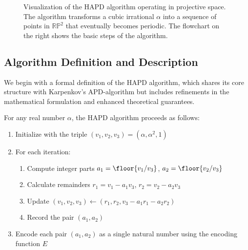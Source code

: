 \begin{figure}[h]
\caption{Visualization of the HAPD algorithm operating in projective space. The algorithm transforms a cubic irrational $\alpha$ into a sequence of points in $\mathbb{RP}^2$ that eventually becomes periodic. The flowchart on the right shows the basic steps of the algorithm.}
\label{fig:hapd_visualization}
\end{figure}

\subsection{Algorithm Definition and Description}

We begin with a formal definition of the HAPD algorithm, which shares its core structure with Karpenkov's APD-algorithm but includes refinements in the mathematical formulation and enhanced theoretical guarantees.

\begin{algorithm_def}\label{alg:hapd}
For any real number $\alpha$, the HAPD algorithm proceeds as follows:
\begin{enumerate}
    \item Initialize with the triple $(v_1, v_2, v_3) = (\alpha, \alpha^2, 1)$
    \item For each iteration:
    \begin{enumerate}
        \item Compute integer parts $a_1 = \floor{v_1/v_3}$, $a_2 = \floor{v_2/v_3}$
        \item Calculate remainders $r_1 = v_1 - a_1v_3$, $r_2 = v_2 - a_2v_3$
        \item Update $(v_1, v_2, v_3) \leftarrow (r_1, r_2, v_3 - a_1r_1 - a_2r_2)$
        \item Record the pair $(a_1, a_2)$
    \end{enumerate}
    \item Encode each pair $(a_1, a_2)$ as a single natural number using the encoding function $E$
\end{enumerate}
\end{algorithm_def}

